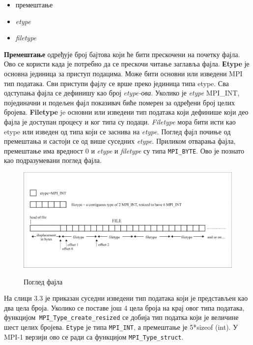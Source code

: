 \begin{itemize}
\item премештање
\item \textit{etype}
\item \textit{filetype}
\end{itemize}

\textbf{Премештање} одређује број бајтова који ће бити прескочени на почетку фајла. Ово се користи када је потребно да се прескочи читање заглавља фајла.
\textbf{Еtype} је основна јединица за приступ подацима. Може бити основни или изведени MPI тип података. Сви приступи фајлу се врше преко јединица типа etype. Сва одступања фајла се дефинишу као број \textit{ etype-ова}. Уколико је \textit{etype} MPI\_INT, појединачни и подељен фајл показивач биће померен за одређени број целих бројева.
\textbf{Filetype} je основни или изведени тип података који дефинише који део фајла је доступан процесу и ког типа су подаци. \textit{Filetype} мора бити исти као etype или изведен од типа који се заснива на \textit{etype}.
Поглед фајл почиње од премештања и састоји се од више суседних \textit{etype}. Приликом отварања фајла, премештање има вредност 0  и \textit{etype} и \textit{filetype} су типа \texttt{MPI\_BYTE}. Ово је познато као подразумевани поглед фајла. 

\begin{figure}[h!]
  \centering
      \includegraphics[width=1\textwidth]{slike/displacement.png}\\[1cm]
  \caption{Поглед фајла}
\end{figure}

На слици 3.3 је приказан суседни изведени тип података који је представљен као два цела броја. Уколико се поставе још 4 цела броја на крај овог типа података, функцијом\texttt{ MPI\_Type\_create\_resized} се добија тип податка који је величине шест целих бројева. \texttt{Еtype} је типа \texttt{MPI\_INT}, а премештање је 5*sizeof (int). У MPI-1 верзији ово се ради са функцијом \texttt{MPI\_Type\_struct}.

